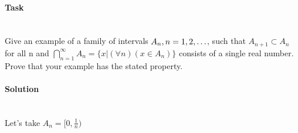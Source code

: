 \documentclass[11pt]{article}
\begin{document}
   \paragraph{Task}\mbox{} \\
       Give an example of a family of intervals $A_{n}, n = 1,2,\mathellipsis$, such that $A_{n+1} \subset A_{n}$ for all n and
       $\displaystyle\bigcap_{n = 1}^{\infty}A_{n} = \{x|(\forall n)(x \in A_{n})\}$ consists of a single real number.
       Prove that your example has the stated property.
   \paragraph{Solution}\mbox{} \\
       Let's take $A_{n} = [0, \frac{1}{n})$
\end{document}
